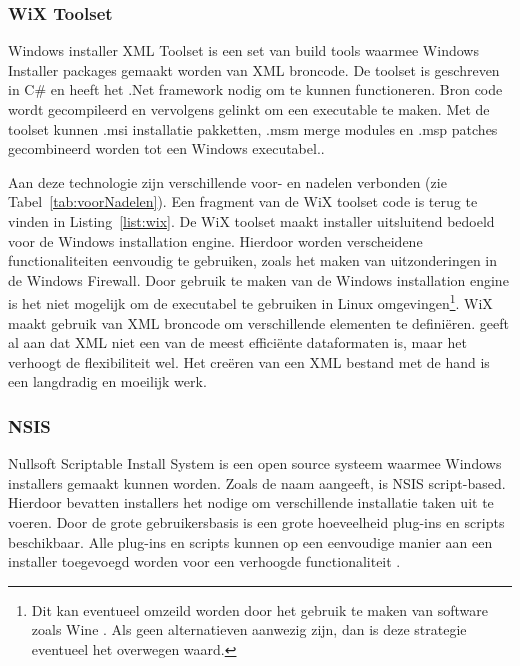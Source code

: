 \subsubsection{WiX Toolset}
Windows installer XML Toolset is een set van build tools waarmee Windows Installer packages gemaakt worden van XML broncode.
De toolset is geschreven in C\# en heeft het .Net framework nodig om te kunnen functioneren.
Bron code wordt gecompileerd en vervolgens gelinkt om een executable te maken.
Met de toolset kunnen .msi installatie pakketten, .msm merge modules en .msp patches gecombineerd worden tot een Windows executabel.\citep{wixToolset}.

Aan deze technologie zijn verschillende voor- en nadelen verbonden (zie Tabel~\ref{tab:voorNadelen}).
Een fragment van de WiX toolset code is terug te vinden in Listing~\vref{list:wix}.
De WiX toolset maakt installer uitsluitend bedoeld voor de Windows installation engine.
Hierdoor worden verscheidene functionaliteiten eenvoudig te gebruiken, zoals het maken van uitzonderingen in de Windows Firewall.
Door gebruik te maken van de Windows installation engine is het niet mogelijk om de executabel te gebruiken in Linux omgevingen\footnote{Dit kan eventueel omzeild worden door het gebruik te maken van software zoals Wine \citep{amstadt1994wine}. Als geen alternatieven aanwezig zijn, dan is deze strategie eventueel het overwegen waard.}.
WiX maakt gebruik van XML broncode om verschillende elementen te definiëren.
\citet{xmill} geeft al aan dat XML niet een van de meest efficiënte dataformaten is, maar het verhoogt de flexibiliteit wel.
Het creëren van een XML bestand met de hand is een langdradig en moeilijk werk.

\subsubsection{NSIS}
Nullsoft Scriptable Install System is een open source systeem waarmee Windows installers gemaakt kunnen worden.
Zoals de naam aangeeft, is NSIS script-based.
Hierdoor bevatten installers het nodige om verschillende installatie taken uit te voeren.
Door de grote gebruikersbasis is een grote hoeveelheid plug-ins en scripts beschikbaar.
Alle plug-ins en scripts kunnen op een eenvoudige manier aan een installer toegevoegd worden voor een verhoogde functionaliteit \citep{nsisMain}.

